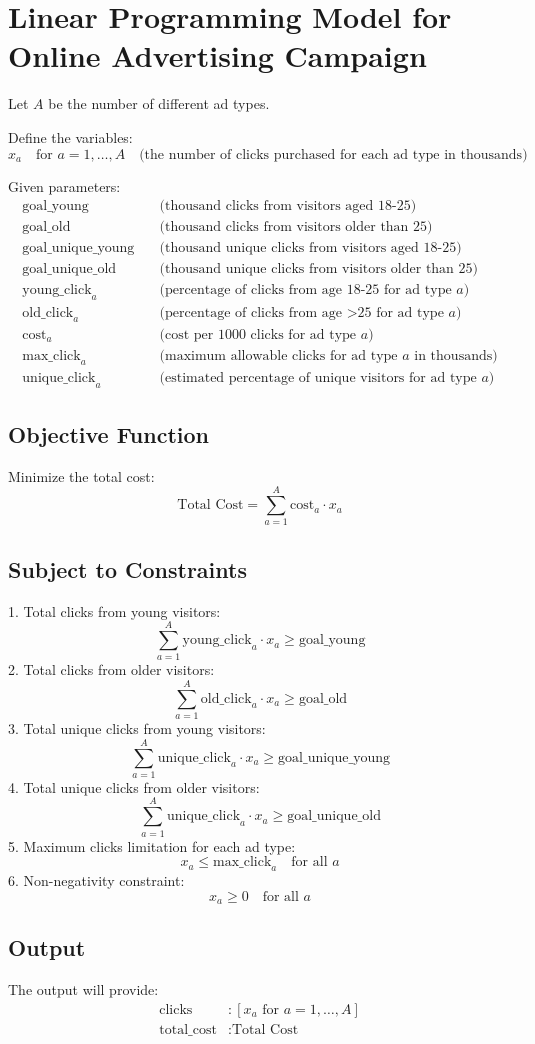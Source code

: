 \documentclass{article}
\begin{document}
\section*{Linear Programming Model for Online Advertising Campaign}

Let \( A \) be the number of different ad types.

Define the variables:
\[
x_a \quad \text{for } a = 1, \ldots, A \quad \text{(the number of clicks purchased for each ad type in thousands)}
\]

Given parameters:
\begin{align*}
\text{goal\_young} & \quad \text{(thousand clicks from visitors aged 18-25)} \\
\text{goal\_old} & \quad \text{(thousand clicks from visitors older than 25)} \\
\text{goal\_unique\_young} & \quad \text{(thousand unique clicks from visitors aged 18-25)} \\
\text{goal\_unique\_old} & \quad \text{(thousand unique clicks from visitors older than 25)} \\
\text{young\_click}_a & \quad \text{(percentage of clicks from age 18-25 for ad type } a) \\
\text{old\_click}_a & \quad \text{(percentage of clicks from age >25 for ad type } a) \\
\text{cost}_a & \quad \text{(cost per 1000 clicks for ad type } a) \\
\text{max\_click}_a & \quad \text{(maximum allowable clicks for ad type } a \text{ in thousands)} \\
\text{unique\_click}_a & \quad \text{(estimated percentage of unique visitors for ad type } a)
\end{align*}

\subsection*{Objective Function}
Minimize the total cost:
\[
\text{Total Cost} = \sum_{a=1}^{A} \text{cost}_a \cdot x_a
\]

\subsection*{Subject to Constraints}
1. Total clicks from young visitors:
\[
\sum_{a=1}^{A} \text{young\_click}_a \cdot x_a \geq \text{goal\_young}
\]
2. Total clicks from older visitors:
\[
\sum_{a=1}^{A} \text{old\_click}_a \cdot x_a \geq \text{goal\_old}
\]
3. Total unique clicks from young visitors:
\[
\sum_{a=1}^{A} \text{unique\_click}_a \cdot x_a \geq \text{goal\_unique\_young}
\]
4. Total unique clicks from older visitors:
\[
\sum_{a=1}^{A} \text{unique\_click}_a \cdot x_a \geq \text{goal\_unique\_old}
\]
5. Maximum clicks limitation for each ad type:
\[
x_a \leq \text{max\_click}_a \quad \text{for all } a
\]
6. Non-negativity constraint:
\[
x_a \geq 0 \quad \text{for all } a
\]

\subsection*{Output}
The output will provide:
\begin{align*}
\text{clicks} & : [x_a \text{ for } a = 1, \ldots, A] \\
\text{total\_cost} & : \text{Total Cost}
\end{align*}
\end{document}
